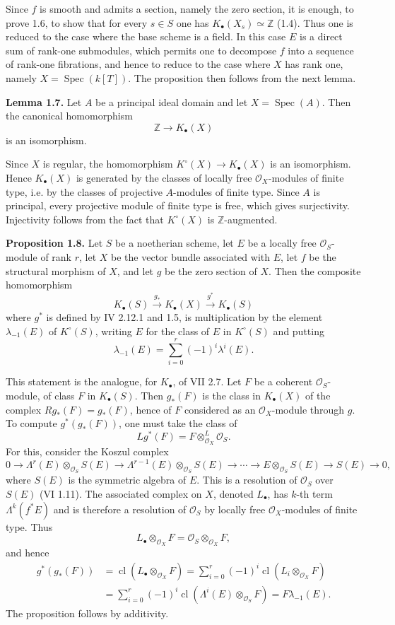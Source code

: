\documentclass[11pt]{article}
\newcommand{\cl}{\operatorname{cl}}
\newcommand{\Spec}{\operatorname{Spec}}
\begin{document}
Since $f$ is smooth and admits a section, namely the zero section, it is enough, to prove 1.6, to show that for every $s\in S$ one has $K_\bullet(X_s)\simeq \mathbb Z$ (1.4). Thus one is reduced to the case where the base scheme is a field. In this case $E$ is a direct sum of rank-one submodules, which permits one to decompose $f$ into a sequence of rank-one fibrations, and hence to reduce to the case where $X$ has rank one, namely $X=\Spec(k[T])$. The proposition then follows from the next lemma.

\textbf{Lemma 1.7.} Let $A$ be a principal ideal domain and let $X=\Spec(A)$. Then the canonical homomorphism
\[
 \mathbb Z\longrightarrow K_\bullet(X)
\]
is an isomorphism.

Since $X$ is regular, the homomorphism $K^\circ(X)\to K_\bullet(X)$ is an isomorphism. Hence $K_\bullet(X)$ is generated by the classes of locally free $\mathcal O_X$-modules of finite type, i.e. by the classes of projective $A$-modules of finite type. Since $A$ is principal, every projective module of finite type is free, which gives surjectivity. Injectivity follows from the fact that $K^\circ(X)$ is $\mathbb Z$-augmented.

\textbf{Proposition 1.8.} Let $S$ be a noetherian scheme, let $E$ be a locally free $\mathcal O_S$-module of rank $r$, let $X$ be the vector bundle associated with $E$, let $f$ be the structural morphism of $X$, and let $g$ be the zero section of $X$. Then the composite homomorphism
\[
 K_\bullet(S)\xrightarrow{g_*}K_\bullet(X)\xrightarrow{g^*}K_\bullet(S)
\]
where $g^*$ is defined by IV 2.12.1 and 1.5, is multiplication by the element $\lambda_{-1}(E)$ of $K^\circ(S)$, writing $E$ for the class of $E$ in $K^\circ(S)$ and putting
\[
 \lambda_{-1}(E)=\sum_{i=0}^r(-1)^i\lambda^i(E).
\]

This statement is the analogue, for $K_\bullet$, of VII 2.7. Let $F$ be a coherent $\mathcal O_S$-module, of class $F$ in $K_\bullet(S)$. Then $g_*(F)$ is the class in $K_\bullet(X)$ of the complex $Rg_*(F)=g_*(F)$, hence of $F$ considered as an $\mathcal O_X$-module through $g$. To compute $g^*(g_*(F))$, one must take the class of
\[
 Lg^*(F)=F\otimes^L_{\mathcal O_X}\mathcal O_S.
\]
For this, consider the Koszul complex
\[
0\longrightarrow \Lambda^r(E)\otimes_{\mathcal O_S}S(E)\longrightarrow
\Lambda^{r-1}(E)\otimes_{\mathcal O_S}S(E)\longrightarrow \cdots\longrightarrow
E\otimes_{\mathcal O_S}S(E)\longrightarrow S(E)\longrightarrow 0,
\]
where $S(E)$ is the symmetric algebra of $E$. This is a resolution of $\mathcal O_S$ over $S(E)$ (VI 1.11). The associated complex on $X$, denoted $L_\bullet$, has $k$-th term $\Lambda^k(f^*E)$ and is therefore a resolution of $\mathcal O_S$ by locally free $\mathcal O_X$-modules of finite type. Thus
\[
 L_\bullet\otimes_{\mathcal O_X}F=\mathcal O_S\otimes_{\mathcal O_X}F,
\]
and hence
\[
\begin{aligned}
 g^*(g_*(F))
 &=\cl(L_\bullet\otimes_{\mathcal O_X}F)
   =\sum_{i=0}^r(-1)^i\cl(L_i\otimes_{\mathcal O_X}F)\\
 &=\sum_{i=0}^r(-1)^i\cl(\Lambda^i(E)\otimes_{\mathcal O_S}F)
   =F\lambda_{-1}(E).
\end{aligned}
\]
The proposition follows by additivity.
\end{document}
